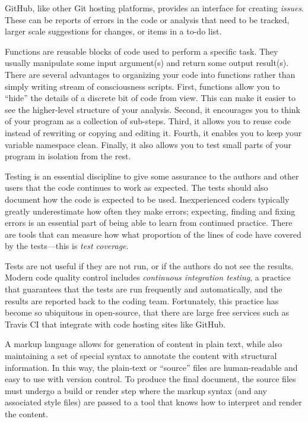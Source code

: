 GitHub, like other Git hosting platforms, provides an interface for creating
\emph{issues}.  These can be reports of errors in the code or analysis that need
to be tracked, larger scale suggestions for changes, or items in a to-do list.

Functions are reusable blocks of code used to perform a specific task.
They usually manipulate some input argument(s) and return some output
result(s).
There are several advantages to organizing your code into functions rather
than simply writing stream of consciousness scripts.
First, functions allow you to ``hide'' the details of a discrete bit of
code from view.
This can make it easier to see the higher-level structure of your analysis.
Second, it encourages you to think of your program as a collection of sub-steps.
Third, it allows you to reuse code instead of rewriting or copying and editing it.
Fourth, it enables you to keep your variable namespace clean.
Finally, it also allows you to test small parts of your program in isolation
from the rest.

Testing is an essential discipline to give some assurance to the authors and
other users that the code continues to work as expected.
The tests should also document how the code is expected to be used.
Inexperienced coders typically greatly underestimate how often they make
errors; expecting, finding and fixing errors is an essential part of being
able to learn from continued practice.
There are tools that can measure how what proportion of the lines
of code have covered by the tests---this is \emph{test coverage}.


Tests are not useful if they are not run, or if the authors do not see the
results.  Modern code quality control includes \emph{continuous integration
testing}, a practice that guarantees that the tests are run frequently and
automatically, and the results are reported back to the coding team.
Fortunately, this practice has become so ubiquitous in open-source, that there
are large free services such as Travis CI that integrate with code hosting sites
like GitHub.

%
A markup language allows for generation of content in plain text, while also
maintaining a set of special syntax to annotate the content with structural
information.
In this way, the plain-text or ``source'' files are human-readable and easy to
use with version control.
To produce the final document, the source files must undergo a build or render
step where the markup syntax (and any associated style files) are passed to a
tool that knows how to interpret and render the content.

